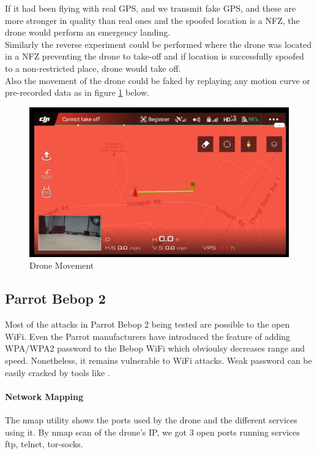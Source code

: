 \documentclass[conference]{IEEEtran}
\begin{document}
If it had been flying with real GPS, and we transmit fake GPS, and these are more stronger in quality than real ones and the spoofed location is a
NFZ, the drone would perform an emergency landing.
\\
Similarly the reverse experiment could be performed where the drone was located in a NFZ preventing the drone to take-off and if location is successfully spoofed to a non-restricted place, drone would take off.
\\
Also the movement of the drone could be faked by replaying any motion curve or pre-recorded data as in figure \ref{fig:drone mov} below.
\begin{figure}[h!]
	\centering
	\includegraphics[width=0.9\columnwidth]{moving}
	\caption{Drone Movement}
	\label{fig:drone mov}
\end{figure}

\subsection{Parrot Bebop 2}
Most of the attacks in Parrot Bebop 2 being tested are possible to the open WiFi. Even the Parrot manufacturers have introduced the feature of adding WPA/WPA2 password to the Bebop WiFi which obvioulsy decreases range and speed. Nonetheless, it remains vulnerable to WiFi attacks. Weak password can be easily cracked by tools like \cite{aircrack}.

\paragraph*{Network Mapping}
The nmap utility shows the ports used by the drone and the different services using it. By nmap scan of the drone's IP, we got 3 open ports running services ftp, telnet, tor-socks. 
\end{document}
